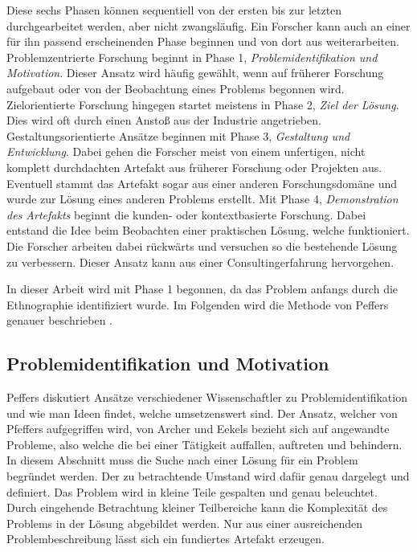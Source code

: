 Diese sechs Phasen können sequentiell von der ersten bis zur letzten durchgearbeitet werden, aber nicht zwangsläufig. Ein Forscher kann auch an einer für ihn passend erscheinenden Phase beginnen und von dort aus weiterarbeiten. Problemzentrierte Forschung beginnt in Phase 1, \textit{Problemidentifikation und Motivation}. Dieser Ansatz wird häufig gewählt, wenn auf früherer Forschung aufgebaut oder von der Beobachtung eines Problems begonnen wird. Zielorientierte Forschung hingegen startet meistens in Phase 2, \textit{Ziel der Lösung}. Dies wird oft durch einen Anstoß aus der Industrie angetrieben. Gestaltungsorientierte Ansätze beginnen mit Phase 3, \textit{Gestaltung und Entwicklung}. Dabei gehen die Forscher meist von einem unfertigen, nicht komplett durchdachten Artefakt aus früherer Forschung oder Projekten aus. Eventuell stammt das Artefakt sogar aus einer anderen Forschungsdomäne und wurde zur Lösung eines anderen Problems erstellt. Mit Phase 4, \textit{Demonstration des Artefakts} beginnt die kunden- oder kontextbasierte Forschung. Dabei entstand die Idee beim Beobachten einer praktischen Lösung, welche funktioniert. Die Forscher arbeiten dabei rückwärts und versuchen so die bestehende Lösung zu verbessern. Dieser Ansatz kann aus einer Consultingerfahrung hervorgehen.

In dieser Arbeit wird mit Phase 1 begonnen, da das Problem anfangs durch die Ethnographie identifiziert wurde. Im Folgenden wird die Methode von Peffers genauer beschrieben \cite{peffers_design_2007}.

\subsection{Problemidentifikation und Motivation}

Peffers diskutiert Ansätze verschiedener Wissenschaftler zu Problemidentifikation und wie man Ideen findet, welche umsetzenswert sind. Der Ansatz, welcher von Pfeffers aufgegriffen wird, von Archer \cite{archer_systematic_1965} und Eekels \cite{eekels_methodological_1991} bezieht sich auf angewandte Probleme, also welche die bei einer Tätigkeit auffallen, auftreten und behindern. \\
In diesem Abschnitt muss die Suche nach einer Lösung für ein Problem begründet werden. Der zu betrachtende Umstand wird dafür genau dargelegt und definiert. Das Problem wird in kleine Teile gespalten und genau beleuchtet. Durch eingehende Betrachtung kleiner Teilbereiche kann die Komplexität des Problems in der Lösung abgebildet werden. Nur aus einer ausreichenden Problembeschreibung lässt sich ein fundiertes Artefakt erzeugen. 

